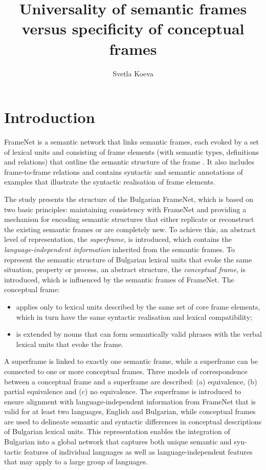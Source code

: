 \documentclass[output=paper,colorlinks,citecolor=brown]{langscibook}
\title{Universality of semantic frames versus specificity of conceptual frames}
\author{Svetla Koeva\orcid{0000-0001-5947-8736}\affiliation{Department of Computational Linguistics, Institute for Bulgarian Language, Bulgarian Academy of Sciences}}
\begin{document}
\maketitle

\section{Introduction} 

FrameNet is a semantic network that links semantic frames, each evoked by a set of lexical units and consisting of frame elements (with semantic types, definitions and relations) that outline the semantic structure of the frame \citep{Fillmore2003,fillmore2010}. It also includes frame-to-frame relations and contains syntactic and semantic annotations of examples that illustrate the syntactic realisation of frame elements.

The study presents the structure of the Bulgarian FrameNet, which is based on two basic principles: maintaining consistency with FrameNet and providing a mechanism for encoding semantic structures that either replicate or reconstruct the existing semantic frames or are completely new. To achieve this, an abstract level of representation, the \emph{superframe}, is introduced, which contains the \emph{language-independent information} inherited from the semantic frames. To represent the semantic structure of Bulgarian lexical units that evoke the same situation, property or process, an abstract structure, the \emph{conceptual frame}, is introduced, which is influenced by the semantic frames of FrameNet. The conceptual frame:

\begin{itemize}
\item applies only to lexical units described by the same set of core frame elements, which in turn have the same syntactic realisation and lexical compatibility;
\item is extended by nouns that can form semantically valid phrases with the verbal lexical units that evoke the frame.
\end{itemize}

A superframe is linked to exactly one semantic frame, while a superframe can be connected to one or more conceptual frames. Three models of correspondence between a conceptual frame and a superframe are described: (a) equivalence, (b) partial equivalence and (c) no equivalence. The superframe is introduced to ensure alignment with language-independent information from FrameNet that is valid for at least two languages, English and Bulgarian, while conceptual frames are used to delineate semantic and syntactic differences in conceptual descriptions of Bulgarian lexical units. This representation enables the integration of Bulgarian into a global network that captures both unique semantic and syn- tactic features of individual languages as well as language-independent features that may apply to a large group of languages.
\end{document}
